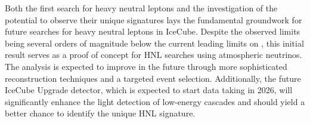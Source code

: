 Both the first search for heavy neutral leptons and the investigation of the potential to observe their unique signatures lays the fundamental groundwork for future searches for heavy neutral leptons in IceCube. Despite the observed limits being several orders of magnitude below the current leading limits on , this initial result serves as a proof of concept for HNL searches using atmospheric neutrinos. The analysis is expected to improve in the future through more sophisticated reconstruction techniques and a targeted event selection. Additionally, the future IceCube Upgrade detector, which is expected to start data taking in 2026, will significantly enhance the light detection of low-energy cascades and should yield a better chance to identify the unique HNL signature.
